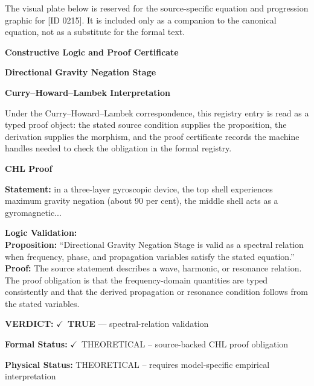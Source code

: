 \begingroup\footnotesize\sloppy
The visual plate below is reserved for the source-specific equation and progression graphic for [ID 0215]. It is included only as a companion to the canonical equation, not as a substitute for the formal text.
\par\endgroup
\ifTZPDarkEdition
{}
\fi

\clearpage
\begingroup\tzpsupportsetup
\noindent\textbf{\fontsize{10.8pt}{12.8pt}\selectfont [ID 0215] Constructive Logic and Proof Certificate}\par
\noindent\textbf{\fontsize{10pt}{12pt}\selectfont Directional Gravity Negation Stage}\par
\vspace{0.45em}
\begingroup
\footnotesize
\setlength{\parskip}{0.22em}
\setlength{\parindent}{0pt}
\noindent\textbf{Curry--Howard--Lambek Interpretation}\par
Under the Curry--Howard--Lambek correspondence, this registry entry is read as a typed proof
object: the stated source condition supplies the proposition, the derivation supplies the
morphism, and the proof certificate records the machine handles needed to check the obligation
in the formal registry.

\vspace{0.45em}
\noindent\textbf{CHL Proof}\par
\textbf{Statement:} in a three-layer gyroscopic device, the top shell experiences maximum gravity negation
(about 90 per cent), the middle shell acts as a gyromagnetic...

\textbf{Logic Validation:}\\
\textbf{Proposition:} ``Directional Gravity Negation Stage is valid as a spectral relation when frequency,
phase, and propagation variables satisfy the stated equation.''\\
\textbf{Proof:} The source statement describes a wave, harmonic, or resonance relation. The proof
obligation is that the frequency-domain quantities are typed consistently and that the
derived propagation or resonance condition follows from the stated variables.

\textbf{VERDICT:} \ensuremath{\checkmark}\ \textbf{TRUE} --- spectral-relation validation

\textbf{Formal Status:} \ensuremath{\checkmark}\ THEORETICAL -- source-backed CHL proof obligation

\textbf{Physical Status:} THEORETICAL -- requires model-specific empirical interpretation
\par\vspace{0.45em}
\par
\ifTZPDarkEdition
{}
\fi
\endgroup
\endgroup

